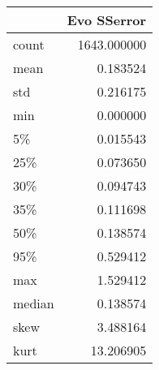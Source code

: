 \begin{tabular}{lr}
\toprule
{} &  Evo SSerror \\
\midrule
count  &  1643.000000 \\
mean   &     0.183524 \\
std    &     0.216175 \\
min    &     0.000000 \\
5\%     &     0.015543 \\
25\%    &     0.073650 \\
30\%    &     0.094743 \\
35\%    &     0.111698 \\
50\%    &     0.138574 \\
95\%    &     0.529412 \\
max    &     1.529412 \\
median &     0.138574 \\
skew   &     3.488164 \\
kurt   &    13.206905 \\
\bottomrule
\end{tabular}
